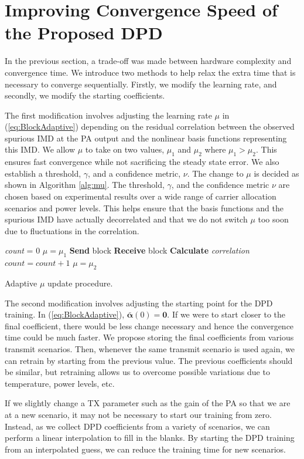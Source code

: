 \section{Improving Convergence Speed of the Proposed DPD}
\label{sec:ConvergenceSpeed}
In the previous section, a trade-off was made between hardware complexity and convergence time. We introduce two methods to help relax the extra time that is necessary to converge sequentially. 
Firstly, we modify the learning rate, and secondly, we modify the starting coefficients.

The first modification involves adjusting the learning rate $\mu$ in (\ref{eq:BlockAdaptive}) depending on the residual correlation between the observed spurious IMD at the PA output and the nonlinear basis functions representing this IMD.
 We allow $\mu$ to take on two values, $\mu_1$ and $\mu_2$ where $\mu_1 > \mu_2$. 
 This ensures fast convergence while not sacrificing the steady state error. 
 We also establish a threshold, $\gamma$, and a confidence metric, $\nu$. 
 The change to $\mu$ is decided as shown in Algorithm \ref{alg:mu}.
The threshold, $\gamma$, and the confidence metric $\nu$ are chosen based on experimental results over a wide range of carrier allocation scenarios and power levels. 
This helps ensure that the basis functions and the spurious IMD have actually decorrelated and that we do not switch $\mu$ too soon due to fluctuations in the correlation.
\begin{algorithm}[h]
	\SetAlgoLined
	\textit{count} = 0\;
	$\mu = \mu_1$\;
	{
		\textbf{Send} block\;
		\textbf{Receive} block\;
		\textbf{Calculate} \textit{correlation}\;
		{
			$count = count + 1$\; 
		}
		{
			$\mu = \mu_2$\; 
		}
	}
	\caption{Adaptive $\mu$ update procedure.}
	\label{alg:mu}
\end{algorithm}


The second modification involves adjusting the starting point for the DPD training. 
In (\ref{eq:BlockAdaptive}), $\bar{\boldsymbol{\alpha}}(0) = \mathbf{0}$. 
If we were to start closer to the final coefficient, there would be less change necessary and hence the convergence time could be much faster. 
We propose storing the final coefficients from various transmit scenarios. 
Then, whenever the same transmit scenario is used again, we can retrain by starting from the previous value. The previous coefficients should be similar, but retraining allows us to overcome possible variations due to temperature, power levels, etc. 

If we slightly change a TX parameter such as the gain of the PA so that we are at a new scenario, it may not be necessary to start our training from zero. Instead, as we collect DPD coefficients from a variety of scenarios, we can perform a linear interpolation to fill in the blanks. By starting the DPD training from an interpolated guess, we can reduce the training time for new scenarios.

